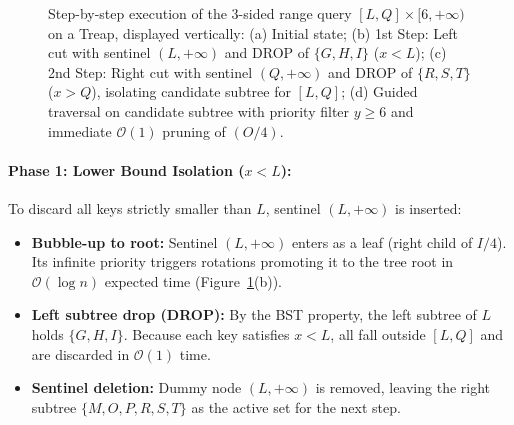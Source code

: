 \begin{figure}[htbp]
{%
}
\caption{Step-by-step execution of the 3-sided range query $[L, Q] \times [6, +\infty)$ on a Treap, displayed vertically: (a) Initial state; (b) 1st Step: Left cut with sentinel $(L, +\infty)$ and DROP of $\{G, H, I\}$ ($x < L$); (c) 2nd Step: Right cut with sentinel $(Q, +\infty)$ and DROP of $\{R, S, T\}$ ($x > Q$), isolating candidate subtree for $[L, Q]$; (d) Guided traversal on candidate subtree with priority filter $y \ge 6$ and immediate $\mathcal{O}(1)$ pruning of $(O / 4)$.}
\label{fig:3-sided-step-by-step-example-en}
\end{figure}

\paragraph{Phase 1: Lower Bound Isolation ($x < L$):}
To discard all keys strictly smaller than $L$, sentinel $(L, +\infty)$ is inserted:
\begin{itemize}
    \item \textbf{Bubble-up to root:} Sentinel $(L, +\infty)$ enters as a leaf (right child of $I / 4$). Its infinite priority triggers rotations promoting it to the tree root in $\mathcal{O}(\log n)$ expected time (Figure~\ref{fig:3-sided-step-by-step-example-en}(b)).
    \item \textbf{Left subtree drop (DROP):} By the BST property, the left subtree of $L$ holds $\{G, H, I\}$. Because each key satisfies $x < L$, all fall outside $[L, Q]$ and are discarded in $\mathcal{O}(1)$ time.
    \item \textbf{Sentinel deletion:} Dummy node $(L, +\infty)$ is removed, leaving the right subtree $\{M, O, P, R, S, T\}$ as the active set for the next step.
\end{itemize}

